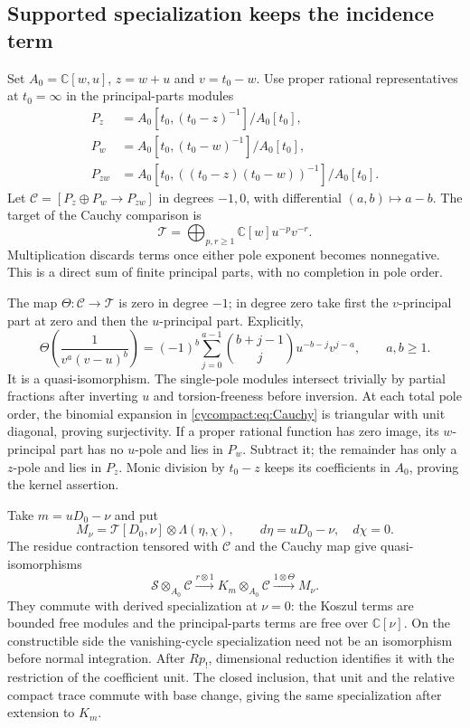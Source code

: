 \subsection{Supported specialization keeps the incidence term}

Set $A_0=\mathbb C[w,u]$, $z=w+u$ and $v=t_0-w$.
Use proper rational representatives at $t_0=\infty$
in the principal-parts modules
\[
\begin{split}
 P_z&=A_0[t_0,(t_0-z)^{-1}]/A_0[t_0],\\
 P_w&=A_0[t_0,(t_0-w)^{-1}]/A_0[t_0],\\
 P_{zw}&=A_0[t_0,((t_0-z)(t_0-w))^{-1}]/A_0[t_0].
\end{split}
\]
Let $\mathcal C=[P_z\oplus P_w\to P_{zw}]$ in degrees
$-1,0$, with differential $(a,b)\mapsto a-b$.
The target of the Cauchy comparison is
\[
 \mathcal T=\bigoplus_{p,r\geq1}\mathbb C[w]u^{-p}v^{-r}.
\]
Multiplication discards terms once either pole exponent
becomes nonnegative. This is a direct sum of finite
principal parts, with no completion in pole order.

The map $\Theta:\mathcal C\to\mathcal T$ is zero in
degree $-1$; in degree zero take first the $v$-principal
part at zero and then the $u$-principal part. Explicitly,
\begin{equation}\label{cycompact:eq:Cauchy}
 \Theta\!\left(\frac1{v^a(v-u)^b}\right)
 =(-1)^b\sum_{j=0}^{a-1}\binom{b+j-1}{j}
       u^{-b-j}v^{j-a},\qquad a,b\geq1.
\end{equation}
It is a quasi-isomorphism. The single-pole modules
intersect trivially by partial fractions after
inverting $u$ and torsion-freeness before inversion.
At each total pole order, the binomial expansion in
\eqref{cycompact:eq:Cauchy} is triangular with unit
diagonal, proving surjectivity. If a proper rational
function has zero image, its $w$-principal part has
no $u$-pole and lies in $P_w$. Subtract it; the
remainder has only a $z$-pole and lies in $P_z$.
Monic division by $t_0-z$ keeps its coefficients
in $A_0$, proving the kernel assertion.

Take $m=uD_0-\nu$ and put
\[
 M_\nu=\mathcal T[D_0,\nu]\otimes\Lambda(\eta,\chi),
 \qquad d\eta=uD_0-\nu,\quad d\chi=0.
\]
The residue contraction tensored with $\mathcal C$
and the Cauchy map give quasi-isomorphisms
\begin{equation}\label{cycompact:eq:supported-normal}
 \mathscr S\otimes_{A_0}\mathcal C
 \xrightarrow{r\otimes1}K_m\otimes_{A_0}\mathcal C
 \xrightarrow{1\otimes\Theta}M_\nu.
\end{equation}
They commute with derived specialization at $\nu=0$:
the Koszul terms are bounded free modules and the
principal-parts terms are free over $\mathbb C[\nu]$.
On the constructible side the vanishing-cycle
specialization need not be an isomorphism before
normal integration. After $Rp_!$, dimensional
reduction identifies it with the restriction of
the coefficient unit. The closed inclusion, that
unit and the relative compact trace commute with
base change, giving the same specialization after
extension to $K_m$.

